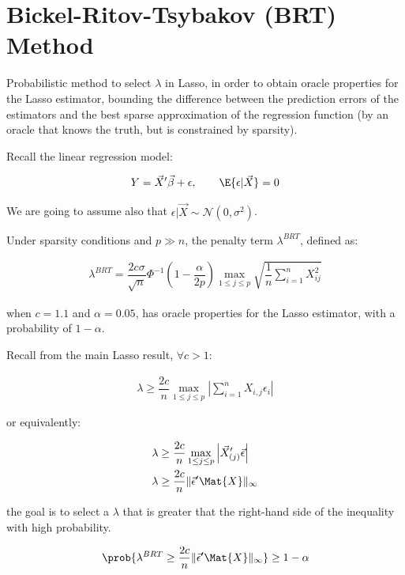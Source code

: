 \section{Bickel-Ritov-Tsybakov (BRT) Method}

Probabilistic method to select $\lambda$ in Lasso, in order to obtain oracle properties for the Lasso estimator, bounding the difference between the prediction errors of the estimators and the best sparse approximation of the regression function (by an oracle that knows the truth, but is constrained by sparsity).

Recall the linear regression model:

\begin{align*}
  Y = \Vec{X}'\Vec{\beta} + \epsilon, \qquad \E{\epsilon | \Vec{X}} = 0
\end{align*}

We are going to assume also that $\epsilon | \Vec{X} \sim \mathcal{N}(0, \sigma^2)$.

Under sparsity conditions and $p \gg n$, the penalty term $\lambda^{BRT}$, defined as:

\begin{align*}
  \lambda^{BRT} = {
    \dfrac{2c\sigma}{\sqrt{n}}
    \Phi^{-1}\left(1 - \dfrac{\alpha}{2p}\right)
    \max_{1 \leq j \leq p} \sqrt{
        \dfrac{1}{n} \sum_{i=1}^n X_{ij}^2
    }
  }
\end{align*}

when $c = 1.1$ and $\alpha = 0.05$, has oracle properties for the Lasso estimator, with a probability of $1 - \alpha$.

Recall from the main Lasso result, $\forall c > 1$:

\begin{align*}
\lambda  \geq \dfrac{2c}{n} \max_{1 \leq j \leq p} \left| \sum_{i=1}^{n} X_{i,j} \epsilon_{i} \right|
\end{align*}

or equivalently:
    
\begin{align*}
\lambda  &\geq \dfrac{2c}{n} \max_{1 \leq j \leq p} \left| \Vec{X}_{(j)}' \Vec{\epsilon} \right|\\
\lambda  &\geq \dfrac{2c}{n} \| \Vec{\epsilon}'\Mat{X}\|_{\infty}
\end{align*}

the goal is to select a $\lambda$ that is greater that the right-hand side of the inequality with high probability.

\begin{lemma}
\begin{align*}
\prob{
    \lambda^{BRT} 
    \geq
    \dfrac{2c}{n} \| \Vec{\epsilon}'\Mat{X}\|_{\infty}
} 
\geq 
1 - \alpha
\end{align*}
\end{lemma}

